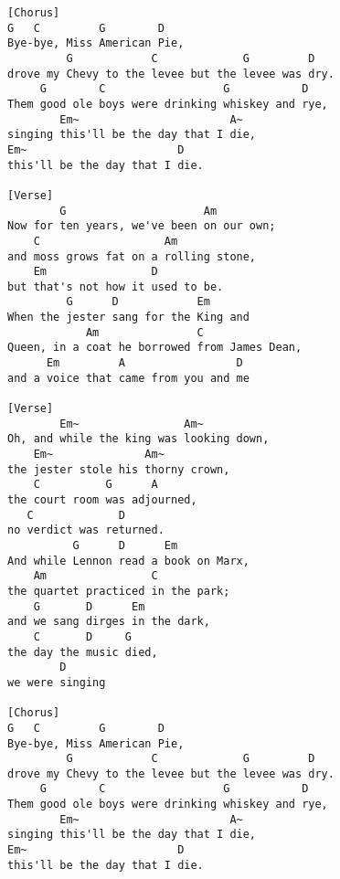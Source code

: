 \documentclass[../../songbookMain]{subfiles}
\begin{document}
\begin{verbatim}
[Chorus]
G   C         G        D
Bye-bye, Miss American Pie,
         G            C             G         D
drove my Chevy to the levee but the levee was dry.
     G        C                  G           D
Them good ole boys were drinking whiskey and rye,
        Em~                       A~
singing this'll be the day that I die,
Em~                       D
this'll be the day that I die.
 
[Verse]
        G                     Am
Now for ten years, we've been on our own;
    C                   Am
and moss grows fat on a rolling stone,
    Em                D
but that's not how it used to be.
         G      D            Em
When the jester sang for the King and
            Am               C
Queen, in a coat he borrowed from James Dean,
      Em         A                 D
and a voice that came from you and me
 
[Verse]
        Em~                Am~
Oh, and while the king was looking down,
    Em~              Am~
the jester stole his thorny crown,
    C          G      A
the court room was adjourned,
   C             D
no verdict was returned.
          G      D      Em
And while Lennon read a book on Marx,
    Am                C
the quartet practiced in the park;
    G       D      Em
and we sang dirges in the dark,
    C       D     G
the day the music died,
        D
we were singing
 
[Chorus]
G   C         G        D
Bye-bye, Miss American Pie,
         G            C             G         D
drove my Chevy to the levee but the levee was dry.
     G        C                  G           D
Them good ole boys were drinking whiskey and rye,
        Em~                       A~
singing this'll be the day that I die,
Em~                       D
this'll be the day that I die.
\end{verbatim}
\end{document}
